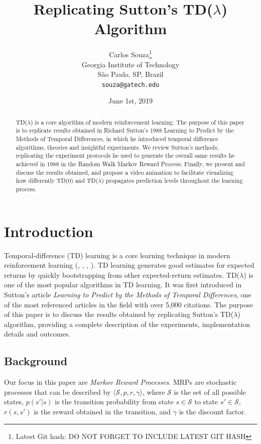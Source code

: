 \documentclass{article}
\title{Replicating Sutton's TD($\lambda$) Algorithm}
\date{June 1st, 2019}	%
\author{
  Carlos Souza\thanks{Latest Git hash: DO NOT FORGET TO INCLUDE LATEST GIT HASH}\\
  Georgia Institute of Technology\\
  São Paulo, SP, Brazil \\
  \texttt{souza@gatech.edu} \\
}
\begin{document}
\maketitle

\begin{abstract}
    TD($\lambda$) is a core algorithm of modern reinforcement learning.
    The purpose of this paper is to replicate results obtained in Richard Sutton's 1988 Learning to Predict by the Methods of Temporal Differences, in which he introduced temporal difference algorithms, theories and insightful experiments.
    We review Sutton's methods, replicating the experiment protocols he used to generate the overall same results he achieved in 1988 in the Random Walk Markov Reward Process.
    Finally, we present and discuss the results obtained, and propose a video animation to facilitate visualizing how differently TD(0) and TD($\lambda$) propagates prediction levels throughout the learning process.
\end{abstract}




\section{Introduction}
\label{sec:introduction}
Temporal-difference (TD) learning is a core learning technique in modern reinforcement learning (\cite{Sutton1988}, \cite{Sutton:1998:IRL:551283}, \cite{KLMSurvey}, \cite{Szepesvari:2010:ARL:1855083}).
TD learning generates good estimates for expected returns by quickly bootstrapping from other expected-return estimates.
TD($\lambda$) is one of the most popular algorithms in TD learning.
It was first introduced in Sutton's article \emph{Learning to Predict by the Methods of Temporal Differences}, one of the most referenced articles in the field with over 5,000 citations.
The purpose of this paper is to discuss the results obtained by replicating Sutton's TD($\lambda$) algorithm, providing a complete description of the experiments, implementation details and outcomes.

\subsection{Background}
\label{subsec:background}
Our focus in this paper are \emph{Markov Reward Processes}.
MRPs are stochastic processes that can be described by \(\langle\mathcal{S}, p, r, \gamma\rangle\), where \(\mathcal{S}\) is the set of all possible states, \(p(s'|s)\) is the transition probability from state \(s \in \mathcal{S}\) to state \(s' \in \mathcal{S}\), \(r(s, s')\) is the reward obtained in the transition, and \(\gamma\) is the discount factor.
\end{document}
